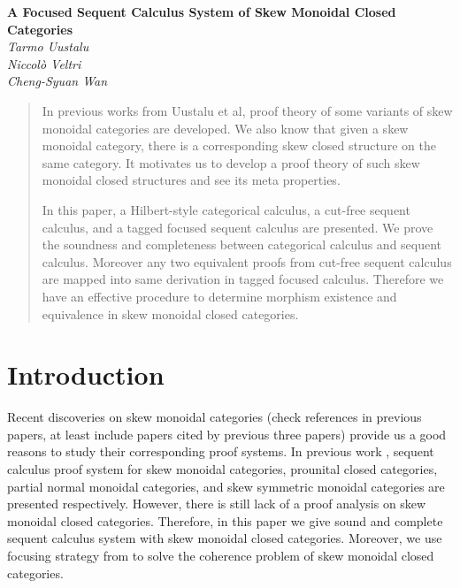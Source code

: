 \documentclass{article}
\begin{document}
\begin{titlepage}
   \begin{center}
      \Large\textbf{A Focused Sequent Calculus System of Skew Monoidal Closed Categories}\\
      \large\textit{Tarmo Uustalu}\\
      \large\textit{Niccol\`o Veltri}\\
      \large\textit{Cheng-Syuan Wan}
   \end{center}
\end{titlepage}
\begin{abstract}
  In previous works from Uustalu et al, proof theory of some variants of skew monoidal categories are developed.
  We also know that given a skew monoidal category, there is a corresponding skew closed structure on the same category.
  It motivates us to develop a proof theory of such skew monoidal closed structures and see its meta properties.

  In this paper, a Hilbert-style categorical calculus, a cut-free sequent calculus, and a tagged focused sequent calculus are presented.
  We prove the soundness and completeness between categorical calculus and sequent calculus.
  Moreover any two equivalent proofs from cut-free sequent calculus are mapped into same derivation in tagged focused calculus.
  Therefore we have an effective procedure to determine morphism existence and equivalence in skew monoidal closed categories.
\end{abstract}
\section{Introduction}
Recent discoveries on skew monoidal categories \cite{szlachanyi_skew-monoidal_2012} \cite{lack_skew_2012} \cite{lack_triangulations_2014} (check references in previous papers, at least include papers cited by previous three papers) provide us a good reasons to study their corresponding proof systems.
In previous work \cite{uustalu_sequent_2018} \cite{uustalu_deductive_nodate} \cite{uustalu_proof_nodate} \cite{veltri_coherence_2021}, sequent calculus proof system for skew monoidal categories, prounital closed categories, partial normal monoidal categories, and skew symmetric monoidal categories are presented respectively.
However, there is still lack of a proof analysis on skew monoidal closed categories.
Therefore, in this paper we give sound and complete sequent calculus system with skew monoidal closed categories.
Moreover, we use focusing strategy from \cite{andreoli_logic_1992} to solve the coherence problem of skew monoidal closed categories.
\end{document}
